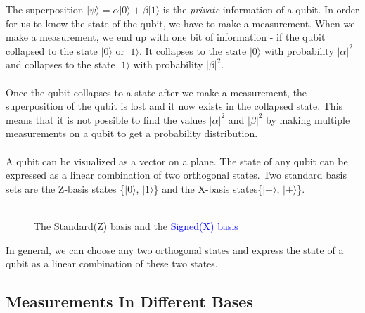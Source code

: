 \documentclass[a4paper]{article}
\begin{document}
The superposition $|\psi\rangle = \alpha|0\rangle + \beta|1\rangle$ is the \textit{private} information of a qubit. In order for us to know the state of the qubit, we have to make a measurement. When we make a measurement, we end up with one bit of information - if the qubit collapsed to the state $|0\rangle$ or $|1\rangle$.  It collapses to the state $|0\rangle$ with probability $|\alpha|^2$ and collapses to the state $|1\rangle$ with probability $|\beta|^2$.
\\ \\
Once the qubit collapses to a state after we make a measurement, the superposition of the qubit is lost and it now exists in the collapsed state. This means that it is not possible to find the values $|\alpha|^2$ and $|\beta|^2$ by making multiple measurements on a qubit to get a probability distribution.
\\ \\
A qubit can be visualized as a vector on a plane. The state of any qubit can be expressed as a linear combination of two orthogonal states. Two standard basis sets are the Z-basis states \{$|0\rangle$, $|1\rangle$\} and the X-basis states\{$|-\rangle$, $|+\rangle$\}.
\\ \\
\begin{figure}[h]
\centering
{}
\caption{The Standard(Z) basis and the \textcolor{blue}{Signed(X) basis}}
\end{figure}

In general, we can choose any two orthogonal states and express the state of a qubit as a linear combination of these two states. 

\subsection{Measurements In Different Bases} %
\label{sub:measurement in different bases}
\end{document}
